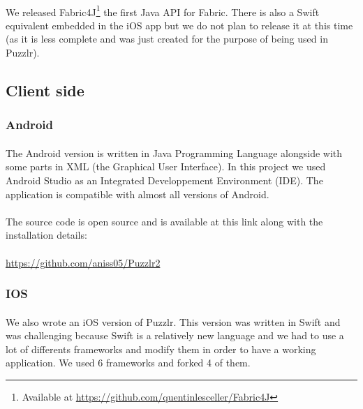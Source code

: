  			\paragraph{}
 			We released Fabric4J\footnote{Available at \url{https://github.com/quentinlesceller/Fabric4J}} the first Java API for Fabric. There is also a Swift equivalent embedded in the iOS app but we do not plan to release it at this time (as it is less complete and was just created for the purpose of being used in Puzzlr).
 	\subsection{Client side}
 		\subsubsection{Android}
  			\paragraph{}
			The Android version is written in Java Programming Language alongside with some parts in XML (the Graphical User Interface). In this project we used Android Studio as an Integrated Developpement Environment (IDE). The application is compatible with almost all versions of Android.
			\paragraph{}
			The source code is open source and is available at this link along with the installation details:
			\paragraph{}
			\color{blue}\underline{https://github.com/aniss05/Puzzlr2}\color{black} 
	  	
	\subsubsection{IOS}
	\paragraph{}
	We also wrote an iOS version of Puzzlr. This version was written in Swift and was challenging because Swift is a relatively new language and we had to use a lot of differents frameworks and modify them in order to have a working application.
	We used 6 frameworks and forked 4 of them.

